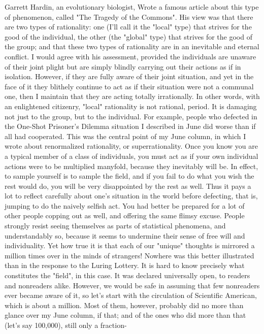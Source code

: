         Garrett Hardin, an evolutionary biologist, Wrote a famous article about this
type of phenomenon, called "The Tragedy of the Commons". His view was that there
are two types of rationality: one (I'll call it the "local" type) that strives for the good of
the individual, the other (the "global" type) that strives for the good of the group; and
that these two types of rationality are in an inevitable and eternal conflict. I would
agree with his assessment, provided the individuals are unaware of their joint plight
but are simply blindly carrying out their actions as if in isolation.
        However, if they are fully aware of their joint situation, and yet in the face of it
they blithely continue to act as if their situation were not a communal one, then I
maintain that they are acting totally irrationally. In other words, with an enlightened
citizenry, "local" rationality is not rational, period. It is damaging not just to the
group, but to the individual. For example, people who defected in the One-Shot
Prisoner's Dilemma situation I described in June did worse than if all had cooperated.
        This was the central point of my June column, in which I wrote about
renormalized rationality, or superrationality. Once you know you are a typical
member of a class of individuals, you must act as if your own individual actions were
to be multiplied manyfold, because they inevitably will be. In effect, to sample
yourself is to sample the field, and if you fail to do what you wish the rest would do,
you will be very disappointed by the rest as well. Thus it pays a lot to reflect carefully
about one's situation in the world before defecting, that is, jumping to do the naively
selfish act. You had better be prepared for a lot of other people copping out as well,
and offering the same flimsy excuse.
        People strongly resist seeing themselves as parts of statistical phenomena, and
understandably so, because it seems to undermine their sense of free will and
individuality. Yet how true it is that each of our "unique" thoughts is mirrored a
million times over in the minds of strangers! Nowhere was this better illustrated than
in the response to the Luring Lottery. It is hard to know precisely what constitutes the
"field", in this case. It was declared universally open, to readers and nonreaders alike.
However, we would be safe in assuming that few nonreaders ever became aware of it,
so let's start with the circulation of Scientific American, which is about a million.
Most of them, however, probably did no more than glance over my June column, if
that; and of the ones who did more than that (let's say 100,000), still only a fraction-
